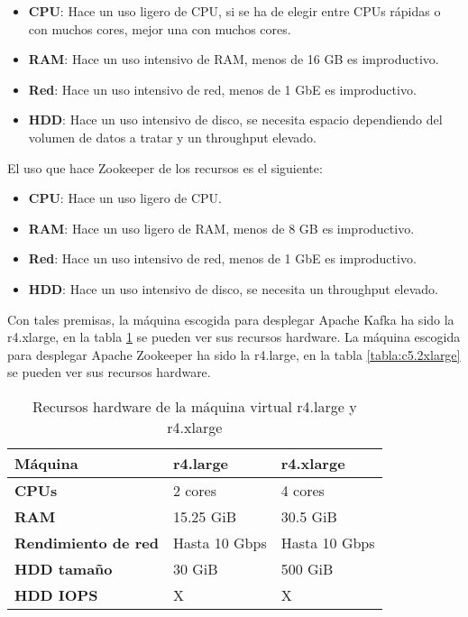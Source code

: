 \begin{itemize} 
	\item \textbf{CPU}: Hace un uso ligero de CPU, si se ha de elegir entre CPUs rápidas o con muchos cores, mejor una con muchos cores.
	\item \textbf{RAM}: Hace un uso intensivo de RAM, menos de 16 GB es improductivo.
	\item \textbf{Red}: Hace un uso intensivo de red, menos de 1 GbE es improductivo.
	\item \textbf{HDD}: Hace un uso intensivo de disco, se necesita espacio dependiendo del volumen de datos a tratar y un throughput elevado.
\end{itemize}

El uso que hace Zookeeper de los recursos es el siguiente:

\begin{itemize} 
	\item \textbf{CPU}: Hace un uso ligero de CPU.
	\item \textbf{RAM}: Hace un uso ligero de RAM, menos de 8 GB es improductivo.
	\item \textbf{Red}: Hace un uso intensivo de red, menos de 1 GbE es improductivo.
	\item \textbf{HDD}: Hace un uso intensivo de disco, se necesita un throughput elevado.
\end{itemize}

Con tales premisas, la máquina escogida para desplegar Apache Kafka ha sido la r4.xlarge, en la tabla \ref{tabla:kafkazookeeper} se pueden ver sus recursos hardware. La máquina escogida para desplegar Apache Zookeeper ha sido la r4.large, en la tabla \ref{tabla:c5.2xlarge} se pueden ver sus recursos hardware.

\begin{table}[H]\label{tabla:kafkazookeeper}
	\centering
	\begin{tabular}{|l|l|l|}
		\hline
		\textbf{Máquina}            & \textbf{r4.large} & \textbf{r4.xlarge} \\ \hline
		\textbf{CPUs}               & 2 cores           & 4 cores            \\ \hline
		\textbf{RAM}                & 15.25 GiB         & 30.5 GiB           \\ \hline
		\textbf{Rendimiento de red} & Hasta 10 Gbps     & Hasta 10 Gbps      \\ \hline
		\textbf{HDD tamaño}         & 30 GiB            & 500 GiB            \\ \hline
		\textbf{HDD IOPS}           & X                 &  X                 \\ \hline
	\end{tabular}
	\caption{Recursos hardware de la máquina virtual r4.large y r4.xlarge}
\end{table}

